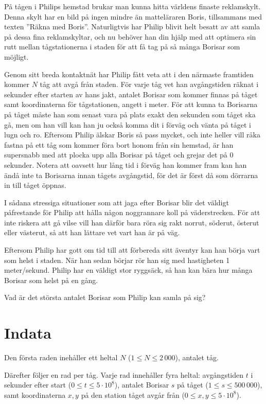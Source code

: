 På tågen i Philips hemstad brukar man kunna hitta världens finaste reklamskylt. Denna skylt har en bild på ingen mindre än matteläraren Boris, tillsammans med texten ''Räkna med Boris''. 
Naturligtvis har Philip blivit helt besatt av att samla på dessa fina reklamskyltar, och nu behöver han din hjälp med att optimera sin rutt mellan tågstationerna i staden för att få tag på så många Borisar som möjligt.

Genom sitt breda kontaktnät har Philip fått veta att i den närmaste framtiden kommer $N$ tåg att avgå från staden. För varje tåg vet han avgångstiden räknat i sekunder efter starten av hans jakt, antalet Borisar som kommer finnas på tåget samt koordinaterna för tågstationen, angett i meter.
För att kunna ta Borisarna på tåget måste han som senast vara på plats exakt den sekunden som tåget ska gå, men om han vill kan han ju också komma dit i förväg och vänta på tåget i lugn och ro.
Eftersom Philip älskar Boris så pass mycket, och inte heller vill råka fastna på ett tåg som kommer föra bort honom från sin hemstad, är han supersnabb med att plocka upp alla Borisar på tåget och grejar det på 0 sekunder. 
Notera att oavsett hur lång tid i förväg han kommer fram kan han ändå inte ta Borisarna innan tågets avgångstid, för det är först då som dörrarna in till tåget öppnas.

I sådana stressiga situationer som att jaga efter Borisar blir det väldigt påfrestande för Philip att hålla någon noggrannare koll på väderstrecken. För att inte riskera att gå vilse vill han därför bara röra sig rakt norrut, söderut, österut eller västerut, så att han lättare vet vart han är på väg.

Eftersom Philip har gott om tid till att förbereda sitt äventyr kan han börja vart som helst i staden. När han sedan börjar rör han sig med hastigheten 1 meter/sekund. Philip har en väldigt stor ryggsäck, så han kan bära hur många Borisar som helst på en gång.

Vad är det största antalet Borisar som Philip kan samla på sig?

\section*{Indata}
Den första raden inehåller ett heltal $N$ ($1 \le N \le 2\,000$), antalet tåg. 

Därefter följer en rad per tåg.
Varje rad innehåller fyra heltal: avgångstiden $t$ i sekunder efter start ($0 \le t \le 5 \cdot 10^8$), antalet Borisar $s$ på tåget ($1 \le s \le 500\,000$), samt koordinaterna $x, y$ på den station tåget avgår från ($0 \le x, y \le 5 \cdot 10^8$).

